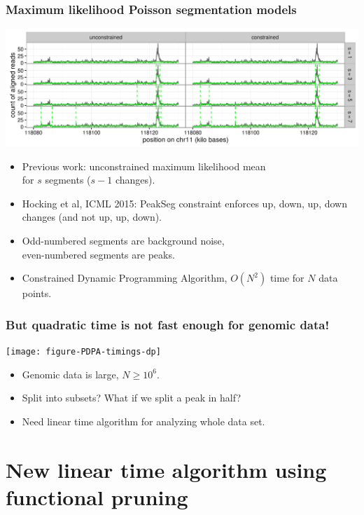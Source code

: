 \documentclass{beamer}
\begin{document}
\begin{frame}
  \frametitle{Maximum likelihood Poisson segmentation models}
  \includegraphics[width=1\textwidth]{figure-Segmentor-PeakSeg}

  \begin{itemize}
  \item Previous work: unconstrained maximum likelihood mean\\
    for $s$ segments ($s-1$ changes).
  \item Hocking et al, ICML 2015: PeakSeg constraint enforces up, down, up,
    down changes (and not up, up, down). 
  \item Odd-numbered segments are background noise,\\
    even-numbered segments are peaks.
  \item Constrained Dynamic Programming Algorithm, 
    $O(N^2)$ time for $N$ data points.
  \end{itemize}
\end{frame}

\begin{frame}
  \frametitle{But quadratic time is not fast enough for genomic data!}
  \texttt{[image: figure-PDPA-timings-dp]}
  \begin{itemize}
  \item Genomic data is large, $N \geq 10^6$.
  \item Split into subsets? What if we split a peak in half?
  \item Need linear time algorithm for analyzing whole data set.
  \end{itemize}
\end{frame}

\section{New linear time algorithm using functional pruning}
\end{document}
